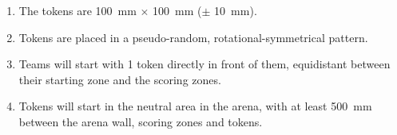 \begin{enumerate}
  \item The tokens are \SI{100}{mm} $\times$ \SI{100}{mm} ($\pm$ \SI{10}{mm}).
  \item Tokens are placed in a pseudo-random, rotational-symmetrical pattern.
  \item Teams will start with 1 token directly in front of them, equidistant
        between their starting zone and the scoring zones.
  \item Tokens will start in the neutral area in the arena, with at least \SI{500}{mm}
        between the arena wall, scoring zones and tokens.
\end{enumerate}
